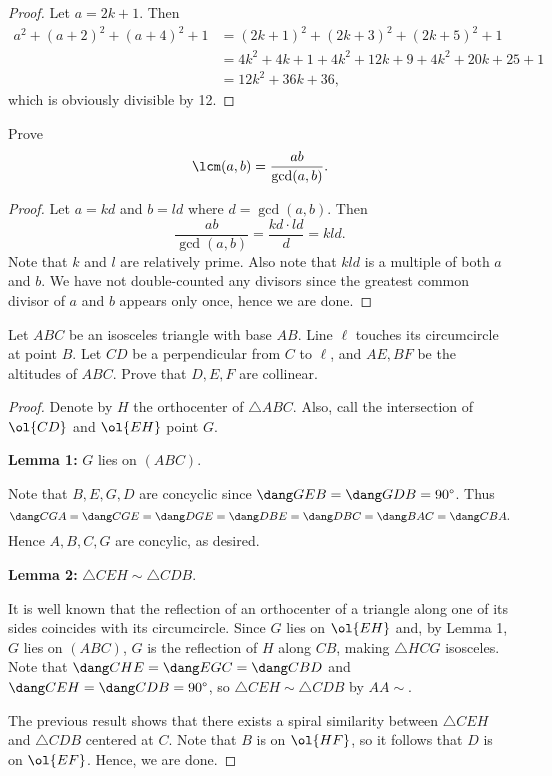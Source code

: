 \documentclass[letterpaper,oneside]{scrartcl}
\begin{document}
\begin{proof}
  Let \(a=2k+1.\) Then
  \begin{align*}
    a^2+(a+2)^2+(a+4)^2+1 & = (2k+1)^2+(2k+3)^2+(2k+5)^2+1       \\
                          & = 4k^2+4k+1+4k^2+12k+9+4k^2+20k+25+1 \\
                          & = 12k^2+36k+36,
  \end{align*}
  which is obviously divisible by 12.
\end{proof}
\begin{problem*}
  Prove \[\lcm(a,b)=\frac{ab}{\gcd(a,b)}.\]
\end{problem*}
\begin{proof}
  Let \(a=kd\) and \(b=ld\) where \(d=\gcd(a,b).\) Then
  \[\frac{ab}{\gcd(a,b)}=\frac{kd\cdot ld}{d}=kld.\]
  Note that \(k\) and \(l\) are relatively prime. Also note that \(kld\) is a multiple of both \(a\) and \(b\). We have not double-counted any divisors since the greatest common divisor of \(a\) and \(b\) appears only once, hence we are done.
\end{proof}
\begin{problem*}
  Let \(ABC\) be an isosceles triangle with base \(AB\). Line \(\ell\) touches its circumcircle at point \(B\). Let \(CD\) be a perpendicular from \(C\) to \(\ell\), and \(AE, BF\) be the altitudes of \(ABC\). Prove that \(D,E,F\) are collinear.
\end{problem*}
\begin{proof}
  Denote by \(H\) the orthocenter of \(\triangle ABC\). Also, call the intersection of \(\ol{CD}\) and \(\ol{EH}\) point \(G.\)

  \textbf{Lemma 1:} \(G\) lies on \((ABC)\).

  \begin{subproof}
    Note that \(B,E,G,D\) are concyclic since \(\dang GEB = \dang GDB = 90\degree\). Thus
    \[\dang CGA = \dang CGE = \dang DGE = \dang DBE = \dang DBC = \dang BAC = \dang CBA.\]
    Hence \(A,B,C,G\) are concylic, as desired.
  \end{subproof}

  \textbf{Lemma 2:} \(\triangle CEH \sim \triangle CDB.\)

  \begin{subproof}
    It is well known that the reflection of an orthocenter of a triangle along one of its sides coincides with its circumcircle. Since \(G\) lies on \(\ol{EH}\) and, by Lemma 1, \(G\) lies on \((ABC)\), \(G\) is the reflection of \(H\) along \(CB\), making \(\triangle HCG\) isosceles. Note that \(\dang CHE = \dang EGC = \dang CBD\) and \(\dang CEH = \dang CDB = 90\degree\), so \(\triangle CEH \sim \triangle CDB\) by \(AA\sim\).
  \end{subproof}

  The previous result shows that there exists a spiral similarity between \(\triangle CEH\) and \(\triangle CDB\) centered at \(C\). Note that \(B\) is on \(\ol{HF}\), so it follows that \(D\) is on \(\ol{EF}\). Hence, we are done.
\end{proof}
\end{document}
